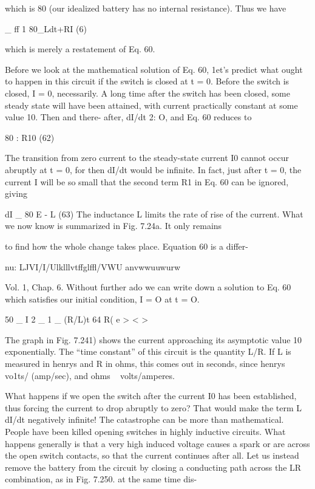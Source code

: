 which is 80 (our idealized battery has no internal resistance). Thus
we have

\begin{equation}
\end{equation}
_ ff 1
80_Ldt+RI (6)

which is merely a restatement of Eq. 60.

Before we look at the mathematical solution of Eq. 60, 1et's predict
what ought to happen in this circuit if the switch is closed at t = 0.
Before the switch is closed, I = 0, necessarily. A long time after the
switch has been closed, some steady state will have been attained,
with current practically constant at some value 10. Then and there-
after, dI/dt 2: O, and Eq. 60 reduces to

\begin{equation}
\end{equation}
80 : R10 (62)

The transition from zero current to the steady-state current I0 cannot
occur abruptly at t = 0, for then dI/dt would be infinite. In fact,
just after t = 0, the current I will be so small that the second term
R1 in Eq. 60 can be ignored, giving

\begin{equation}
\end{equation}
dI _ 80
E - L (63)
The inductance L limits the rate of rise of the current.
What we now know is summarized in Fig. 7.24a. It only remains

to find how the whole change takes place. Equation 60 is a differ-

nu: LJVI/I/Ulklllvtffglffl/VWU anvwwuuwurw

Vol. 1, Chap. 6. Without further ado we can write down a solution
to Eq. 60 which satisfies our initial condition, I = O at t = O.

\begin{equation}
\end{equation}
50 _
I 2 _ 1 _ (R/L)t 64
R( e > < >

The graph in Fig. 7.241) shows the current approaching its asymptotic
value 10 exponentially. The ``time constant'' of this circuit is
the quantity L/R. If L is measured in henrys and R in ohms, this
comes out in seconds, since henrys ~ vo1ts/ (amp/sec), and
ohms ~ volts/amperes.

What happens if we open the switch after the current I0 has been
established, thus forcing the current to drop abruptly to zero? That
would make the term L dI/dt negatively infinite! The catastrophe
can be more than mathematical. People have been killed opening
switches in highly inductive circuits. What happens generally is that
a very high induced voltage causes a spark or are across the open
switch contacts, so that the current continues after all. Let us instead
remove the battery from the circuit by closing a conducting
path across the LR combination, as in Fig. 7.250. at the same time dis-

